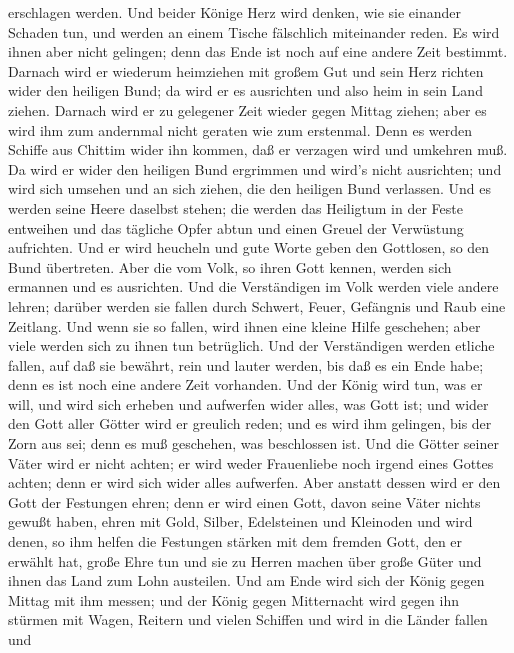 erschlagen werden.  Und beider Könige Herz wird denken, wie
sie einander Schaden tun, und werden an einem Tische fälschlich
miteinander reden. Es wird ihnen aber nicht gelingen; denn das Ende ist
noch auf eine andere Zeit bestimmt.  Darnach wird er
wiederum heimziehen mit großem Gut und sein Herz richten wider den
heiligen Bund; da wird er es ausrichten und also heim in sein Land
ziehen.  Darnach wird er zu gelegener Zeit wieder gegen
Mittag ziehen; aber es wird ihm zum andernmal nicht geraten wie zum
erstenmal.  Denn es werden Schiffe aus Chittim wider ihn
kommen, daß er verzagen wird und umkehren muß. Da wird er wider den
heiligen Bund ergrimmen und wird's nicht ausrichten; und wird sich
umsehen und an sich ziehen, die den heiligen Bund verlassen.
 Und es werden seine Heere daselbst stehen; die werden das
Heiligtum in der Feste entweihen und das tägliche Opfer abtun und einen
Greuel der Verwüstung aufrichten.  Und er wird heucheln und
gute Worte geben den Gottlosen, so den Bund übertreten. Aber die vom
Volk, so ihren Gott kennen, werden sich ermannen und es ausrichten.
 Und die Verständigen im Volk werden viele andere lehren;
darüber werden sie fallen durch Schwert, Feuer, Gefängnis und Raub eine
Zeitlang.  Und wenn sie so fallen, wird ihnen eine kleine
Hilfe geschehen; aber viele werden sich zu ihnen tun betrüglich.
 Und der Verständigen werden etliche fallen, auf daß sie
bewährt, rein und lauter werden, bis daß es ein Ende habe; denn es ist
noch eine andere Zeit vorhanden.  Und der König wird tun,
was er will, und wird sich erheben und aufwerfen wider alles, was Gott
ist; und wider den Gott aller Götter wird er greulich reden; und es wird
ihm gelingen, bis der Zorn aus sei; denn es muß geschehen, was
beschlossen ist.  Und die Götter seiner Väter wird er nicht
achten; er wird weder Frauenliebe noch irgend eines Gottes achten; denn
er wird sich wider alles aufwerfen.  Aber anstatt dessen
wird er den Gott der Festungen ehren; denn er wird einen Gott, davon
seine Väter nichts gewußt haben, ehren mit Gold, Silber, Edelsteinen und
Kleinoden  und wird denen, so ihm helfen die Festungen
stärken mit dem fremden Gott, den er erwählt hat, große Ehre tun und sie
zu Herren machen über große Güter und ihnen das Land zum Lohn austeilen.
 Und am Ende wird sich der König gegen Mittag mit ihm
messen; und der König gegen Mitternacht wird gegen ihn stürmen mit
Wagen, Reitern und vielen Schiffen und wird in die Länder fallen und
